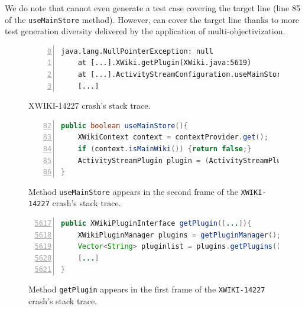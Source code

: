 We do note that \SGGA cannot even generate a test case covering the target line (line 85 of the \texttt{useMainStore} method). However, \decomposition can cover the target line thanks to more test generation diversity delivered by the application of multi-objectivization.

\begin{figure}[t]
    \begin{lstlisting}[numbers=left,
        firstnumber=0]
java.lang.NullPointerException: null
	at [...].XWiki.getPlugin(XWiki.java:5619)
	at [...].ActivityStreamConfiguration.useMainStore([...]:85)
    [...]
    \end{lstlisting}
    \caption{XWIKI-14227 crash's stack trace.}
    \label{lst:moho:stacktracexwiki}
\end{figure}

\begin{figure}[t]
    \begin{lstlisting}[numbers=left,
        firstnumber=82,
        language=Java,
        basicstyle=\footnotesize]
public boolean useMainStore(){
    XWikiContext context = contextProvider.get();
    if (context.isMainWiki()) {return false;}
    ActivityStreamPlugin plugin = (ActivityStreamPlugin) context.getWiki().getPlugin[...] context); // <-- target line 
}
    \end{lstlisting}
    \caption{Method \texttt{useMainStore} appears in the second frame of the \texttt{XWIKI-14227} crash's stack trace.}
\label{lst:xwikiframe2}
\end{figure}
    
\begin{figure}[t]
    \begin{lstlisting}[numbers=left,
            firstnumber=5617,
            language=Java,
            basicstyle=\footnotesize]
public XWikiPluginInterface getPlugin([...]){
    XWikiPluginManager plugins = getPluginManager();
    Vector<String> pluginlist = plugins.getPlugins();
    [...]
}
    \end{lstlisting}
    \caption{Method \texttt{getPlugin} appears in the first frame of the \texttt{XWIKI-14227} crash's stack trace.}
    \label{lst:xwikiframe1}
\end{figure}
            
